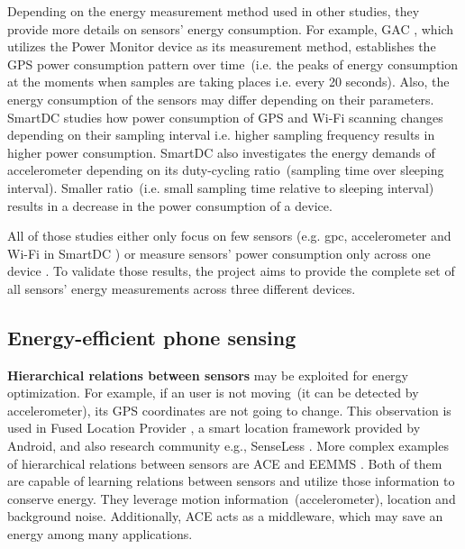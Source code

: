 
Depending on the energy measurement method used in other studies, they provide more details on sensors' energy consumption. For example, GAC \cite{youssef:gac}, which utilizes the Power Monitor device as its measurement method, establishes the GPS power consumption pattern over time\ (i.e. the peaks of energy consumption at the moments when samples are taking places i.e. every 20 seconds). Also, the energy consumption of the sensors may differ depending on their parameters. SmartDC \cite{chon:smartdc} studies how power consumption of GPS and Wi-Fi scanning changes depending on their sampling interval i.e. higher sampling frequency results in higher power consumption. SmartDC also investigates the energy demands of accelerometer depending on its duty-cycling ratio\ (sampling time over sleeping interval). Smaller ratio\ (i.e. small sampling time relative to sleeping interval) results in a decrease in the power consumption of a device.  

All of those studies either only focus on few sensors (e.g. gpc, accelerometer and Wi-Fi in SmartDC \cite{chon:smartdc}) or measure sensors' power consumption only across one device \cite{benabdesslem:senseless}. To validate those results, the project aims to provide the complete set of all sensors' energy measurements across three different devices. 
	
\subsection{Energy-efficient phone sensing}
\textbf{Hierarchical relations between sensors} may be exploited for energy optimization. For example, if an user is not moving\ (it can be detected by accelerometer), its GPS coordinates are not going to change. This observation is used in Fused Location Provider \cite{android:locationapi}, a smart location framework provided by Android, and also research community e.g., SenseLess \cite{benabdesslem:senseless}. More complex examples of hierarchical relations between sensors are ACE \cite{nath:ace} and EEMMS \cite{wang:eemss}. Both of them are capable of learning relations between sensors and utilize those information to conserve energy. They leverage motion information\ (accelerometer), location and background noise. Additionally, ACE acts as a middleware, which may save an energy among many applications.

